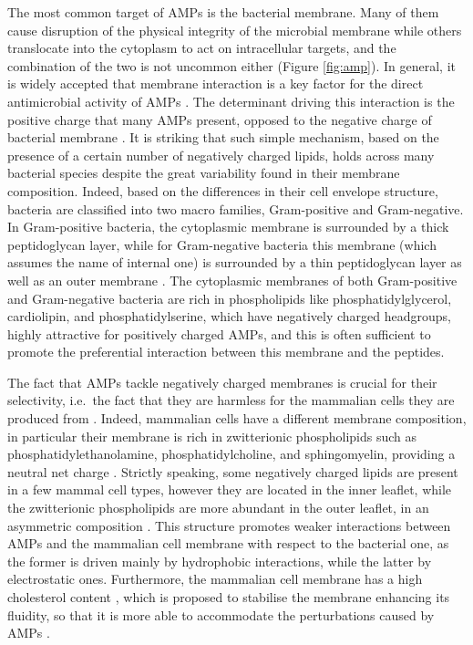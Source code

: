 The most common target of AMPs is the bacterial membrane. Many of them cause disruption of the physical integrity of the microbial membrane while others translocate into the cytoplasm to act on intracellular targets, and the combination of the two is not uncommon either \cite{Hancock2006} (Figure \ref{fig:amp}). In general, it is widely accepted that membrane interaction is a key factor for the direct antimicrobial activity of AMPs \cite{Nguyen2011,Malmsten2016}.
%
The determinant driving this interaction is the positive charge that many AMPs present, opposed to the negative charge of bacterial membrane \cite{Zhang2001,Schmitt2016}.
%
It is striking that such simple mechanism, based on the presence of a certain number of negatively charged lipids, holds across many bacterial species despite the great variability found in their membrane composition.
%
Indeed, based on the differences in their cell envelope structure, bacteria are classified into two macro families, Gram-positive and Gram-negative. In Gram-positive bacteria, the cytoplasmic membrane is surrounded by a thick peptidoglycan layer, while for Gram-negative bacteria this membrane (which assumes the name of internal one) is surrounded by a thin peptidoglycan layer as well as an outer membrane \cite{Lin2016}.
%
The cytoplasmic membranes of both Gram-positive and Gram-negative bacteria are rich in phospholipids like phosphatidylglycerol, cardiolipin, and phosphatidylserine, which have negatively charged headgroups, highly attractive for positively charged AMPs, and this is often sufficient to promote the preferential interaction between this membrane and the peptides.

The fact that AMPs tackle negatively charged membranes is crucial for their selectivity, i.e.\ the fact that they are harmless for the mammalian cells they are produced from \cite{Glukhov2005}. Indeed, mammalian cells have a different membrane composition, in particular their membrane is rich in zwitterionic phospholipids such as phosphatidylethanolamine, phosphatidylcholine, and sphingomyelin, providing a neutral net charge \cite{Spector1985,vanMeer2008}.
%
Strictly speaking, some negatively charged lipids are present in a few mammal cell types, however they are located in the inner leaflet, while the zwitterionic phospholipids are more abundant in the outer leaflet, in an asymmetric composition \cite{???}.
%
This structure promotes weaker interactions between AMPs and the mammalian cell membrane with respect to the bacterial one, as the former is driven mainly by hydrophobic interactions, while the latter by electrostatic ones.
%
Furthermore, the mammalian cell membrane has a high cholesterol content \cite{Yeaman2003, Lai2009}, which is proposed to stabilise the membrane enhancing its fluidity, so that it is more able to accommodate the perturbations caused by AMPs \cite{Zasloff2002}.

